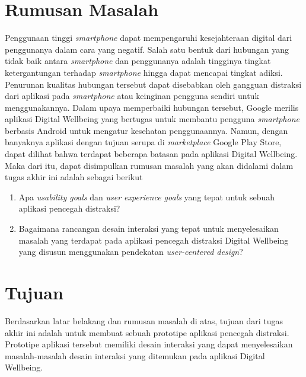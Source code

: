 \section{Rumusan Masalah}

Penggunaan tinggi \textit{smartphone} dapat mempengaruhi kesejahteraan digital dari penggunanya dalam cara yang negatif. Salah satu bentuk dari hubungan yang tidak baik antara \textit{smartphone} dan penggunanya adalah tingginya tingkat ketergantungan terhadap \textit{smartphone} hingga dapat mencapai tingkat adiksi. Penurunan kualitas hubungan tersebut dapat disebabkan oleh gangguan distraksi dari aplikasi pada \textit{smartphone} atau keinginan pengguna sendiri untuk menggunakannya. Dalam upaya memperbaiki hubungan tersebut, Google merilis aplikasi Digital Wellbeing yang bertugas untuk membantu pengguna \textit{smartphone} berbasis Android untuk mengatur kesehatan penggunaannya. Namun, dengan banyaknya aplikasi dengan tujuan serupa di \textit{marketplace} Google Play Store, dapat dilihat bahwa terdapat beberapa batasan pada aplikasi Digital Wellbeing. Maka dari itu, dapat disimpulkan rumusan masalah yang akan didalami dalam tugas akhir ini adalah sebagai berikut

\begin{enumerate}
  \item Apa \textit{usability goals} dan \textit{user experience goals} yang tepat untuk sebuah aplikasi pencegah distraksi?
  \item Bagaimana rancangan desain interaksi yang tepat untuk menyelesaikan masalah yang terdapat pada aplikasi pencegah distraksi Digital Wellbeing yang disusun menggunakan pendekatan \textit{user-centered design}?
\end{enumerate}

\section{Tujuan}

Berdasarkan latar belakang dan rumusan masalah di atas, tujuan dari tugas akhir ini adalah untuk membuat sebuah prototipe aplikasi pencegah distraksi. Prototipe aplikasi tersebut memiliki desain interaksi yang dapat menyelesaikan masalah-masalah desain interaksi yang ditemukan pada aplikasi Digital Wellbeing.


